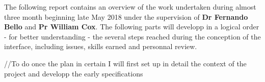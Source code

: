 \newline \vspace{5mm}
The following report contains an overview of the work undertaken during almost three month beginning late May 2018 under the supervision of \textbf{Dr Fernando Bello} and \textbf{Pr William Cox}. The following parts will developp in a logical order - for better understanding - the several steps reached during the conception of the interface, including issues, skills earned and personnal review. 

//To do once the plan in certain
I will first set up in detail the context of the project and developp the early specifications 
  


 





